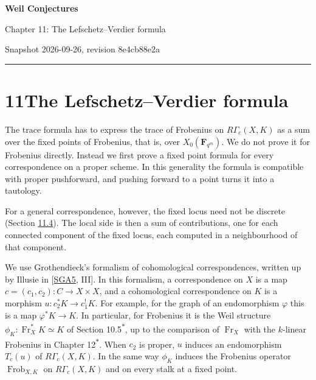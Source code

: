 \documentclass[11pt]{article}
\newcommand{\bpout}[1]{#1\textsuperscript{\hyperlink{bp-outside}{\ensuremath{\ast}}}}
\begin{document}
\pagestyle{plain}
\begin{center}
{\LARGE\bfseries Weil Conjectures\par}
\vspace{0.7em}
{\large Chapter 11: The Lefschetz–Verdier formula\par}
\vspace{0.5em}
{\small\color{bpmuted}Snapshot 2026-09-26, revision 8e4cb88e2a\par}
\end{center}
\vspace{0.5em}
{\small\tableofcontents}
\bigskip\hrule\bigskip

\section*{\texorpdfstring{11\quad The Lefschetz–Verdier formula}{11 The Lefschetz–Verdier formula}}
\label{bp1}%
\label{bp2}%
The trace formula has to express the trace of Frobenius on \(R\Gamma_c(X,K)\) as a sum over the fixed points of Frobenius, that is, over \(X_0(\mathbf F_{q^m})\). We do not prove it for Frobenius directly. Instead we first prove a fixed point formula for every correspondence on a proper scheme. In this generality the formula is compatible with proper pushforward, and pushing forward to a point turns it into a tautology.

For a general correspondence, however, the fixed locus need not be discrete (Section \hyperref[bp26]{11.4}). The local side is then a sum of contributions, one for each connected component of the fixed locus, each computed in a neighbourhood of that component.

We use Grothendieck's formalism of cohomological correspondences, written up by Illusie in [\hyperref[bp57]{SGA5}, III]. In this formalism, a correspondence on \(X\) is a map \(c=(c_1,c_2):C\to X\times X\), and a cohomological correspondence on \(K\) is a morphism \(u:c_2^*K\to c_1^!K\). For example, for the graph of an endomorphism \(\varphi\) this is a map \(\varphi^*K\to K\). In particular, for Frobenius it is the Weil structure \(\phi_K:\operatorname{Fr}_X^*K\simeq K\) of Section \bpout{10.5}, up to the comparison of \(\operatorname{Fr}_X\) with the \(k\)-linear Frobenius in Chapter \bpout{12}. When \(c_2\) is proper, \(u\) induces an endomorphism \(T_c(u)\) of \(R\Gamma_c(X,K)\). In the same way \(\phi_K\) induces the Frobenius operator \(\operatorname{Frob}_{X,K}\) on \(R\Gamma_c(X,K)\) and on every stalk at a fixed point.
\end{document}
